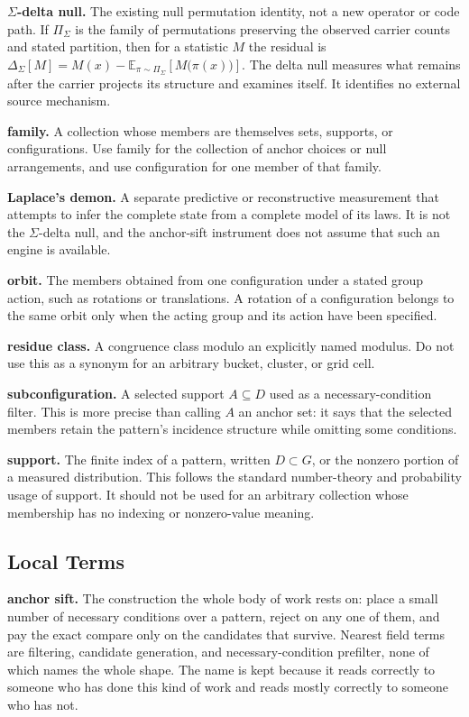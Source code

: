 \noindent\textbf{\(\Sigma\)-delta null.} The existing null permutation identity, not a new operator or code path. If \(\Pi_\Sigma\) is the family of permutations preserving the observed carrier counts and stated partition, then for a statistic \(M\) the residual is \(\Delta_\Sigma[M] = M(x) - \mathbb{E}_{\pi \sim \Pi_\Sigma}\!\left[M\bigl(\pi(x)\bigr)\right].\) The delta null measures what remains after the carrier projects its structure and examines itself. It identifies no external source mechanism.

\noindent\textbf{family.} A collection whose members are themselves sets, supports, or configurations. Use family for the collection of anchor choices or null arrangements, and use configuration for one member of that family.

\noindent\textbf{Laplace's demon.} A separate predictive or reconstructive measurement that attempts to infer the complete state from a complete model of its laws. It is not the \(\Sigma\)-delta null, and the anchor-sift instrument does not assume that such an engine is available.

\noindent\textbf{orbit.} The members obtained from one configuration under a stated group action, such as rotations or translations. A rotation of a configuration belongs to the same orbit only when the acting group and its action have been specified.

\noindent\textbf{residue class.} A congruence class modulo an explicitly named modulus. Do not use this as a synonym for an arbitrary bucket, cluster, or grid cell.

\noindent\textbf{subconfiguration.} A selected support \(A \subseteq D\) used as a necessary-condition filter. This is more precise than calling \(A\) an anchor set: it says that the selected members retain the pattern's incidence structure while omitting some conditions.

\noindent\textbf{support.} The finite index of a pattern, written \(D \subset G\), or the nonzero portion of a measured distribution. This follows the standard number-theory and probability usage of support. It should not be used for an arbitrary collection whose membership has no indexing or nonzero-value meaning.

\subsection{Local Terms}

\noindent\textbf{anchor sift.} The construction the whole body of work rests on: place a small number of necessary conditions over a pattern, reject on any one of them, and pay the exact compare only on the candidates that survive. Nearest field terms are filtering, candidate generation, and necessary-condition prefilter, none of which names the whole shape. The name is kept because it reads correctly to someone who has done this kind of work and reads mostly correctly to someone who has not.


